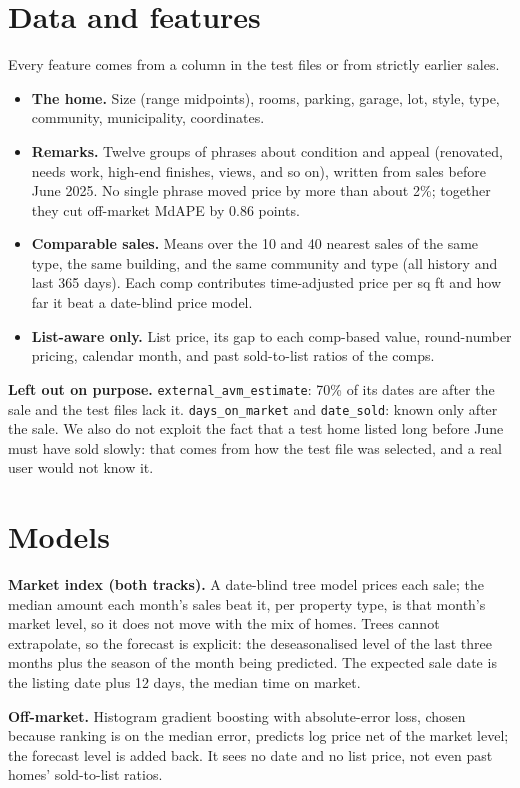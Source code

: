 \documentclass[11pt]{article}
\begin{document}
\section{Data and features}
Every feature comes from a column in the test files or from strictly earlier sales.
\begin{itemize}\itemsep0pt
\item \textbf{The home.} Size (range midpoints), rooms, parking, garage, lot, style, type, community, municipality, coordinates.
\item \textbf{Remarks.} Twelve groups of phrases about condition and appeal (renovated, needs work, high-end finishes, views, and so on), written from sales before June 2025. No single phrase moved price by more than about 2\%; together they cut off-market MdAPE by 0.86 points.
\item \textbf{Comparable sales.} Means over the 10 and 40 nearest sales of the same type, the same building, and the same community and type (all history and last 365 days). Each comp contributes time-adjusted price per sq ft and how far it beat a date-blind price model.
\item \textbf{List-aware only.} List price, its gap to each comp-based value, round-number pricing, calendar month, and past sold-to-list ratios of the comps.
\end{itemize}
\textbf{Left out on purpose.} \texttt{external\_avm\_estimate}: 70\% of its dates are after the sale and the test files lack it. \texttt{days\_on\_market} and \texttt{date\_sold}: known only after the sale. We also do not exploit the fact that a test home listed long before June must have sold slowly: that comes from how the test file was selected, and a real user would not know it.

\section{Models}
\textbf{Market index (both tracks).} A date-blind tree model prices each sale; the median amount each month's sales beat it, per property type, is that month's market level, so it does not move with the mix of homes. Trees cannot extrapolate, so the forecast is explicit: the deseasonalised level of the last three months plus the season of the month being predicted. The expected sale date is the listing date plus 12 days, the median time on market.

\textbf{Off-market.} Histogram gradient boosting with absolute-error loss, chosen because ranking is on the median error, predicts log price net of the market level; the forecast level is added back. It sees no date and no list price, not even past homes' sold-to-list ratios.
\end{document}
